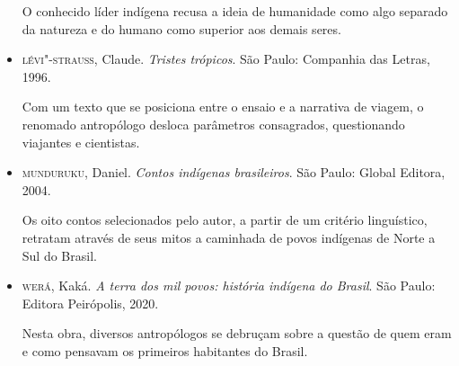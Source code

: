 \documentclass[12pt]{extarticle}
\begin{document}
\begin{itemize}
O conhecido líder indígena recusa a ideia de humanidade como algo
separado da natureza e do humano como superior aos demais seres.

\item\textsc{lévi"-strauss}, Claude. \emph{Tristes trópicos}. São Paulo: Companhia das Letras, 1996.

Com um texto que se posiciona entre o ensaio e a narrativa de viagem, o
renomado antropólogo desloca parâmetros consagrados, questionando
viajantes e cientistas.


\item\textsc{munduruku}, Daniel. \emph{Contos indígenas brasileiros}. São Paulo:
Global Editora, 2004.

Os oito contos selecionados pelo autor, a partir de um critério
linguístico, retratam através de seus mitos a caminhada de povos
indígenas de Norte a Sul do Brasil.


\item\textsc{werá}, Kaká. \emph{A terra dos mil povos: história indígena do Brasil}. São
Paulo: Editora Peirópolis, 2020.

Nesta obra, diversos antropólogos se debruçam sobre a questão de quem
eram e como pensavam os primeiros habitantes do Brasil.
\end{itemize}
\end{document}

